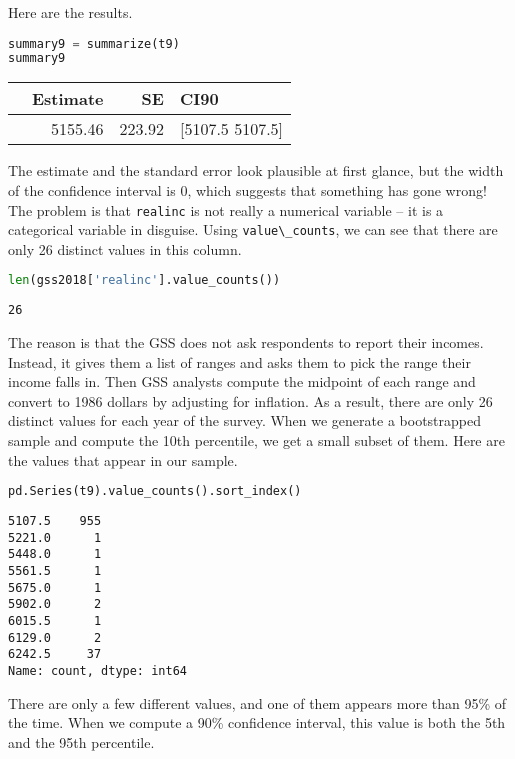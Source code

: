 Here are the results.

\begin{lstlisting}[language=Python,style=source]
summary9 = summarize(t9)
summary9
\end{lstlisting}

\begin{tabular}{lrrl}
\toprule
 & Estimate & SE & CI90 \\
\midrule
 & 5155.46 & 223.92 & [5107.5 5107.5] \\
\bottomrule
\end{tabular}

The estimate and the standard error look plausible at first glance, but
the width of the confidence interval is 0, which suggests that something
has gone wrong! The problem is that \passthrough{\lstinline!realinc!} is
not really a numerical variable -- it is a categorical variable in
disguise. Using \passthrough{\lstinline!value\_counts!}, we can see that
there are only 26 distinct values in this column.

\begin{lstlisting}[language=Python,style=source]
len(gss2018['realinc'].value_counts())
\end{lstlisting}

\begin{lstlisting}[style=output]
26
\end{lstlisting}

The reason is that the GSS does not ask respondents to report their
incomes. Instead, it gives them a list of ranges and asks them to pick
the range their income falls in. Then GSS analysts compute the midpoint
of each range and convert to 1986 dollars by adjusting for inflation. As
a result, there are only 26 distinct values for each year of the survey.
When we generate a bootstrapped sample and compute the 10th percentile,
we get a small subset of them. Here are the values that appear in our
sample.

\begin{lstlisting}[language=Python,style=source]
pd.Series(t9).value_counts().sort_index()
\end{lstlisting}

\begin{lstlisting}[style=output]
5107.5    955
5221.0      1
5448.0      1
5561.5      1
5675.0      1
5902.0      2
6015.5      1
6129.0      2
6242.5     37
Name: count, dtype: int64
\end{lstlisting}

There are only a few different values, and one of them appears more than
95\% of the time. When we compute a 90\% confidence interval, this value
is both the 5th and the 95th percentile.

